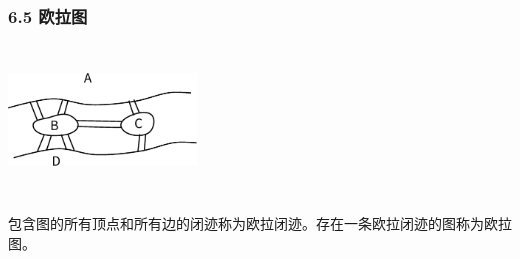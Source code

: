 \documentclass{beamer}
\begin{document}
\begin{CJK*}{UTF8}{gbsn}





\begin{frame}
  \frametitle{6.5 欧拉图}
\centering
\includegraphics[width=5cm,height=4cm]{konigsberg} 
    \pause
  \begin{definition6.5.1}
    包含图的所有顶点和所有边的闭迹称为\alert{欧拉闭迹}。存在一条欧拉闭迹的图称为\alert{欧拉图}。
  \end{definition6.5.1}


\end{frame}
\end{CJK*}
\end{document}
